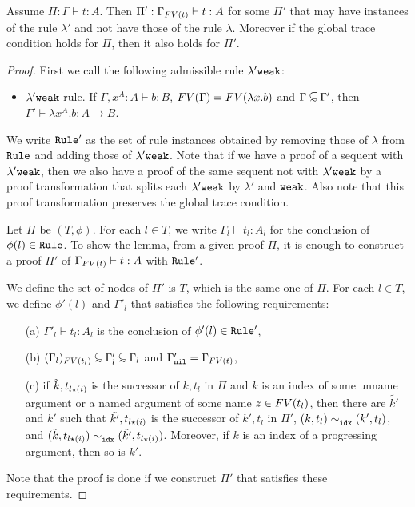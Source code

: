 \begin{lemma}\label{lem:thinning}
  Assume $\Pi:\Gamma\vdash t:A$.
  Then $\Pi':\Gamma_{{{\relax FV}}(t)}\vdash t:A$ for some $\Pi'$ that may have instances of the rule $\lambda'$
  and not have those of the rule $\lambda$.
  Moreover if the global trace condition holds for $\Pi$, then it also holds for $\Pi'$. 
\end{lemma}
\begin{proof}
  First we call the following admissible rule $\lambda'{\tt weak}$:
  \begin{itemize}
  \item
    $\lambda'{\tt weak}$-rule.
    If $\Gamma, x^A:A \vdash b: B$, ${{\relax FV}}(\Gamma) = {{\relax FV}}(\lambda x.b)$ and $\Gamma\subseteqsim \Gamma'$, 
    then $ \Gamma' \vdash \lambda x^A.b :A \rightarrow B$.
  \end{itemize}
  We write ${\tt Rule}'$ as the set of rule instances obtained by removing
  those of $\lambda$ from ${\tt Rule}$ and adding those of $\lambda'{\tt weak}$. 
  Note that if we have a proof of a sequent with $\lambda'{\tt weak}$,
  then we also have a proof of the same sequent not with $\lambda'{\tt weak}$
  by a proof transformation that splits each $\lambda'{\tt weak}$ by $\lambda'$ and ${\tt weak}$. 
  Also note that this proof transformation preserves the global trace condition.

  Let $\Pi$ be $(T,\phi)$.
  For each $l \in T$, we write $\Gamma_l\vdash t_l:A_l$
  for the conclusion of $\phi(l) \in {\tt Rule}$. 
  To show the lemma, from a given proof $\Pi$, 
  it is enough to construct a proof $\Pi'$ of $\Gamma_{{{\relax FV}}(t)}\vdash t:A$ with ${\tt Rule}'$.
  
  We define the set of nodes of $\Pi'$ is $T$, which is the same one of $\Pi$. 
  For each $l\in T$, we define $\phi'(l)$ and $\Gamma'_l$ that satisfies
  the following requirements:
  \begin{itemize}
  \item[(a)]
    $\Gamma'_l\vdash t_l:A_l$ is the conclusion of $\phi'(l) \in {\tt Rule}'$,
  \item[(b)]
    $\Restrict{(\Gamma_l)}{\FV(t_l)} \subseteqsim \Gamma'_l \subseteqsim \Gamma_l$
    and $\Gamma'_{{\tt nil}} = \Gamma_{{{\relax FV}}(t)}$, 
  \item[(c)]
    if $\tilde{k},t_{l{\star}(i)}$ is the successor of $k,t_l$ in $\Pi$
    and $k$ is an index of some unname argument
    or a named argument of some name $z\in{{\relax FV}}(t_l)$, 
    then there are $\tilde{k'}$ and $k'$ such that
    $\tilde{k'},t_{l{\star}(i)}$ is the successor of $k',t_l$ in $\Pi'$, 
    $(k,t_l) \sim^{}_{{\tt idx}} (k',t_l)$,
    and $(\tilde{k},t_{l{\star}(i)}) \sim^{}_{{\tt idx}} (\tilde{k'},t_{l{\star}(i)})$.
    Moreover, if $k$ is an index of a progressing argument, then so is $k'$.
  \end{itemize}
  Note that the proof is done if we construct $\Pi'$ that satisfies these requirements. 
  

\end{proof}
